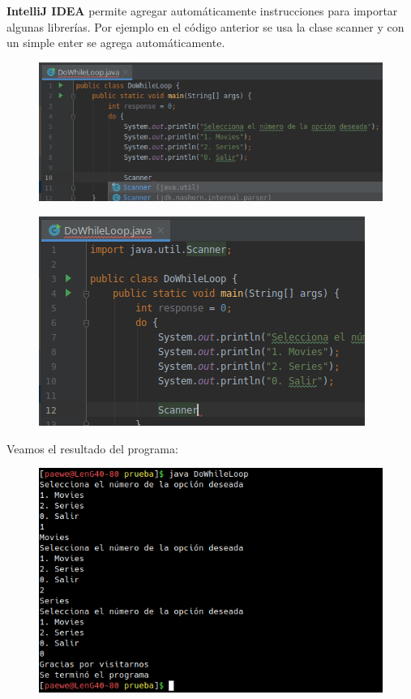 \documentclass{article}
\begin{document}
\textbf{IntelliJ IDEA} permite agregar automáticamente instrucciones para
importar algunas librerías. Por ejemplo en el código anterior se usa la clase
scanner y con un simple enter se agrega automáticamente.\\

\begin{figure}[h!]
  \centering
  \includegraphics[scale=0.75]{./Pictures/052_dowhile.png}
\end{figure}

\begin{figure}[h!]
  \centering
  \includegraphics[scale=0.75]{./Pictures/053_scanner.png}
\end{figure}

Veamos el resultado del programa:\\

\begin{figure}[h!]
  \centering
  \includegraphics[scale=0.75]{./Pictures/054_dowhile.png}
\end{figure}
\end{document}
